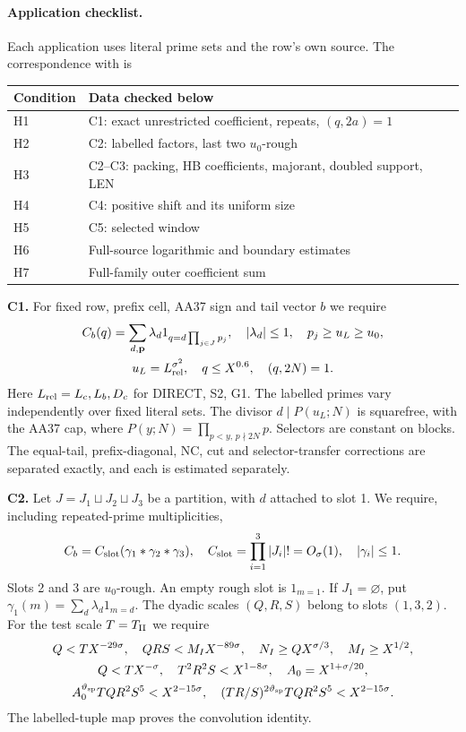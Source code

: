 \paragraph{Application checklist.}
Each application uses literal prime sets and the row's own source.
The correspondence with \cite[\S3]{Z1} is
\begin{center}
\begin{tabular}{@{}ll@{}}
\toprule
Condition & Data checked below \\
\midrule
H1 & C1: exact unrestricted coefficient, repeats, $(q,2a)=1$ \\
H2 & C2: labelled factors, last two $u_0$-rough \\
H3 & C2--C3: packing, HB coefficients, majorant, doubled support, LEN \\
H4 & C4: positive shift and its uniform size \\
H5 & C5: selected window \\
H6 & Full-source logarithmic and boundary estimates \\
H7 & Full-family outer coefficient sum \\
\bottomrule
\end{tabular}
\end{center}
\textbf{C1.} For fixed row, prefix cell, AA37 sign and tail vector $b$ we require
\[
\begin{gathered}
 C_b(q)=\sum_{d,\mathbf p}\lambda_d1_{q=d\prod_{j\in J}p_j},\quad |\lambda_d|\le1,\quad p_j\ge u_L\ge u_0,\\
 u_L=L_{\rm rel}^{\sigma^2},\quad q\le X^{0.6},\quad(q,2N)=1.
\end{gathered}
\]
Here $L_{\rm rel}=L_c,L_b,D_c$ for DIRECT, S2, G1.
The labelled primes vary independently over fixed literal sets.
The divisor $d\mid P(u_L;N)$ is squarefree, with the AA37 cap, where
$P(y;N)=\prod_{p<y,\,p\nmid2N}p$.
Selectors are constant on blocks.
The equal-tail, prefix-diagonal, NC, cut and selector-transfer corrections are separated exactly,
and each is estimated separately.

\textbf{C2.} Let $J=J_1\sqcup J_2\sqcup J_3$ be a partition, with $d$ attached to slot 1.
We require, including repeated-prime multiplicities,
\[
 C_b=C_{\rm slot}(\gamma_1*\gamma_2*\gamma_3),\quad
 C_{\rm slot}=\prod_{i=1}^3|J_i|!=O_\sigma(1),\quad |\gamma_i|\le1.
\]
Slots 2 and 3 are $u_0$-rough.
An empty rough slot is $1_{m=1}$.
If $J_1=\varnothing$, put $\gamma_1(m)=\sum_d\lambda_d1_{m=d}$.
The dyadic scales $(Q,R,S)$ belong to slots $(1,3,2)$.
For the test scale $T=T_{\rm II}$ we require
\[
\begin{gathered}
 Q<TX^{-29\sigma},\quad QRS<M_I X^{-89\sigma},\quad
 N_I\ge QX^{\sigma/3},\quad M_I\ge X^{1/2},\\
 Q<TX^{-\sigma},\quad T^2R^2S<X^{1-8\sigma},\quad A_0=X^{1+\sigma/20},\\
 A_0^{\vartheta_{\rm sp}}TQR^2S^5<X^{2-15\sigma},\quad
 (TR/S)^{2\vartheta_{\rm sp}}TQR^2S^5<X^{2-15\sigma}.
\end{gathered}
\]
The labelled-tuple map proves the convolution identity.

